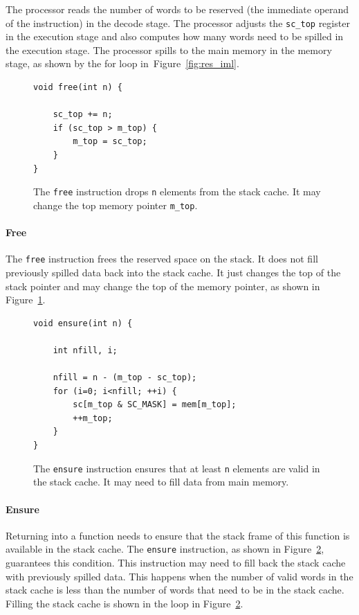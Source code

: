 \documentclass[a4paper,fontsize=10pt,twoside,DIV15,BCOR12mm,headinclude=true,footinclude=false,pagesize,bibtotoc]{scrbook}
\newcommand{\code}[1]{{\texttt{#1}}}
\begin{document}
The processor reads the number of words to be reserved
(the immediate operand of the instruction) in the decode stage.
The processor adjusts the \code{sc\_top} register in the execution
stage and also computes how many words need to be spilled in the
execution stage. The processor spills to the main memory
in the memory stage, as shown by the for loop in~Figure~\ref{fig:res_iml}.

\begin{figure}
\begin{lstlisting}
void free(int n) {

    sc_top += n;
    if (sc_top > m_top) {
        m_top = sc_top;
    }
}
\end{lstlisting}
	\caption{The \code{free} instruction drops \code{n}
	elements from the stack cache. It may change the top memory
	pointer \code{m\_top}.}
 	 \label{fig:free_iml}
\end{figure}

\paragraph{Free} The \code{free} instruction frees the reserved
space on the stack. It does not fill previously spilled data back into the stack cache.
It just changes the top of the stack pointer and may change the top of the memory
pointer, as shown in Figure~\ref{fig:free_iml}.


\begin{figure}
\begin{lstlisting}
void ensure(int n) {

    int nfill, i;

    nfill = n - (m_top - sc_top);
    for (i=0; i<nfill; ++i) {
        sc[m_top & SC_MASK] = mem[m_top];
        ++m_top;
    }
}
\end{lstlisting}
	\caption{The \code{ensure} instruction ensures that
	at least \code{n} elements are valid in the stack cache.
	It may need to fill data from main memory.}
 	\label{fig:ens_iml}
\end{figure}

\paragraph{Ensure} Returning into a function needs to ensure that the stack
frame of this function is available in the stack cache. The \code{ensure} instruction,
as shown in Figure~\ref{fig:ens_iml}, guarantees this condition.
This instruction may need to fill back the stack cache with previously spilled data.
This happens when the number of valid words in the stack cache is less than the
number of words that need to be in the stack cache.
Filling the stack cache is shown in the loop in Figure~\ref{fig:ens_iml}.
\end{document}
